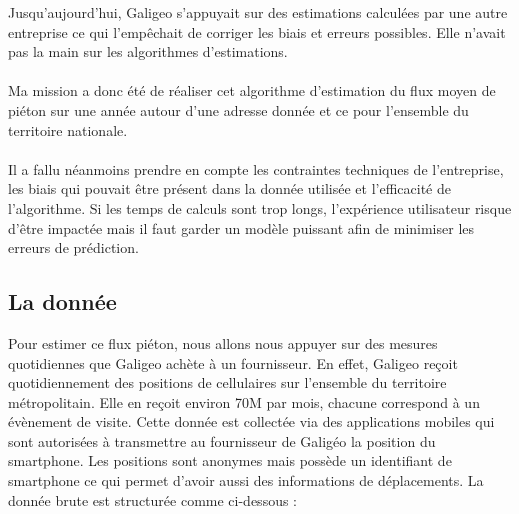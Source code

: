 Jusqu’aujourd’hui, Galigeo s’appuyait sur des estimations calculées par une autre entreprise ce qui l’empêchait de corriger les biais et erreurs possibles. Elle n’avait pas la main sur les algorithmes d’estimations.

\paragraph*{}

Ma mission a donc été de réaliser cet algorithme d’estimation du flux moyen de piéton sur une année autour d’une adresse donnée et ce pour l'ensemble du territoire nationale.

\paragraph{}

Il a fallu néanmoins prendre en compte les contraintes techniques de l’entreprise, les biais qui pouvait être présent dans la donnée utilisée et l’efficacité de l’algorithme. Si les temps de calculs sont trop longs, l’expérience utilisateur risque d’être impactée mais il faut garder un modèle puissant afin de minimiser les erreurs de prédiction.

\subsection{La donnée}

Pour estimer ce flux piéton, nous allons nous appuyer sur des mesures quotidiennes que Galigeo achète à un fournisseur. En effet, Galigeo reçoit quotidiennement des positions de cellulaires sur l'ensemble du territoire métropolitain. Elle en reçoit environ 70M par mois, chacune correspond à un évènement de visite. Cette donnée est collectée via des applications mobiles qui sont autorisées à transmettre au fournisseur de Galigéo la position du smartphone. Les positions sont anonymes mais possède un identifiant de smartphone ce qui permet d'avoir aussi des informations de déplacements. La donnée brute est structurée comme ci-dessous :


